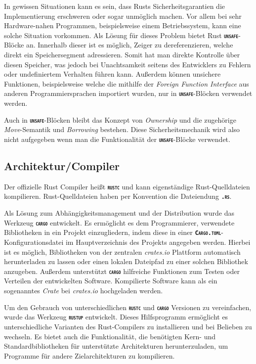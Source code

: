 In gewissen Situationen kann es sein, dass Rusts Sicherheitsgarantien die Implementierung erschweren oder
sogar unmöglich machen. Vor allem bei sehr Hardware-nahen Programmen, beispielsweise einem Betriebssystem,
kann eine solche Situation vorkommen. Als Lösung für dieses Problem bietet Rust
\texttt{\textsc{\textbf{unsafe}}}-Blöcke an. Innerhalb dieser ist es möglich, Zeiger zu dereferenzieren, welche
direkt ein Speichersegment adressieren. Somit hat man direkte Kontrolle über diesen Speicher, was
jedoch bei Unachtsamkeit seitens des Entwicklers zu Fehlern oder undefiniertem Verhalten führen kann.
Außerdem können unsichere Funktionen, beispielsweise welche die mithilfe der
\textit{Foreign Function Interface} aus anderen Programmiersprachen importiert wurden,
nur in \texttt{\textsc{\textbf{unsafe}}}-Blöcken verwendet werden.\cite{rustBook}

Auch in \texttt{\textsc{\textbf{unsafe}}}-Blöcken bleibt das Konzept von \textit{Ownership} und die zugehörige
\textit{Move}-Semantik und \textit{Borrowing} bestehen. Diese Sicherheitsmechanik wird also nicht aufgegeben
wenn man die Funktionalität der \texttt{\textsc{\textbf{unsafe}}}-Blöcke verwendet.\cite{rustBook}

\subsection{Architektur/Compiler}

Der offizielle Rust Compiler heißt \texttt{\textsc{\textbf{rustc}}} und kann eigenständige Rust-Quelldateien
kompilieren. Rust-Quelldateien haben per Konvention die Dateiendung \texttt{\textsc{\textbf{.rs}}}.\cite{rustBook}

Als Lösung zum Abhängigkeitsmanagement und der Distribution wurde das Werkzeug \texttt{\textsc{\textbf{cargo}}} 
entwickelt. Es ermöglicht es dem Programmierer, verwendete Bibliotheken in ein Projekt einzugliedern,
indem diese in einer \texttt{\textsc{\textbf{Cargo.toml}}}-Konfigurationsdatei im Hauptverzeichnis
des Projekts angegeben werden. Hierbei ist es möglich, Bibliotheken von der zentralen \textit{crates.io}
Plattform automatisch herunterladen zu lassen oder einen lokalen Dateipfad zu einer solchen
Bibliothek anzugeben.
Außerdem unterstützt \texttt{\textsc{\textbf{cargo}}} hilfreiche Funktionen zum Testen oder
Verteilen der entwickelten Software. Kompilierte Software kann als ein sogenanntes \textit{Crate} bei
\textit{crates.io} hochgeladen werden.\cite{rustBook}

Um den Gebrauch von unterschiedlichen \texttt{\textsc{\textbf{rustc}}} und \texttt{\textsc{\textbf{cargo}}} Versionen 
zu vereinfachen, wurde das Werkzeug \texttt{\textsc{\textbf{rustup}}} entwickelt. Dieses
Hilfsprogramm ermöglicht es unterschiedliche Varianten des Rust-Compilers zu installieren und bei Belieben zu
wechseln. Es bietet auch die Funktionalität, die benötigten Kern- und Standardbibliotheken für unterstützte
Architekturen herunterzuladen, um Programme für andere Zielarchitekturen zu kompilieren.\cite{rustupRepo}

